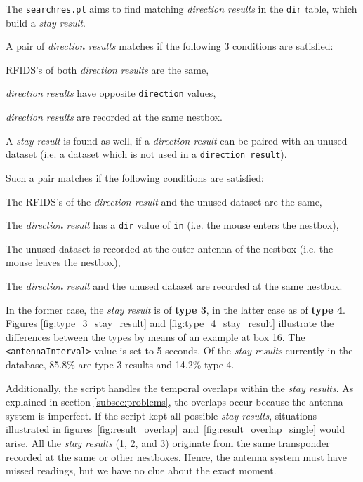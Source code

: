 The \lstinline|searchres.pl| aims to find matching \textit{direction results} in the \lstinline|dir| table, which build a \textit{stay result}.

A pair of \textit{direction results} matches if the following 3 conditions are satisfied:

\begin{mylist}
\item RFIDS's of both \textit{direction results} are the same,
\item \textit{direction results} have opposite \lstinline|direction| values,
\item \textit{direction results} are recorded at the same nestbox.
\end{mylist}

A \textit{stay result} is found as well, if a \textit{direction result} can be paired with an unused dataset (i.e. a dataset which is not used in a \lstinline|direction result|). 

Such a pair matches if the following conditions are satisfied:
 
\begin{mylist}
	\item The RFIDS's of the \textit{direction result} and the unused dataset are the same,
	\item The \textit{direction result} has a \lstinline|dir| value of \lstinline|in| (i.e. the mouse enters the nestbox),
	\item The unused dataset is recorded at the outer antenna of the nestbox (i.e. the mouse leaves the nestbox),
	\item The \textit{direction result} and the unused dataset are recorded at the same nestbox.  
\end{mylist}

In the former case, the \textit{stay result} is of \textbf{type 3}, in the latter case as of \textbf{type 4}. Figures \ref{fig:type_3_stay_result} and \ref{fig:type_4_stay_result} illustrate the differences between the types by means of an example at box 16. The \lstinline|<antennaInterval>| value is set to 5 seconds. Of the \textit{stay results} currently in the database, 85.8\% are type 3 results and 14.2\% type 4. 

Additionally, the script handles the temporal overlaps within the \textit{stay results}. As explained in section \ref{subsec:problems}, the overlaps occur because the antenna system is imperfect. If the script kept all possible \textit{stay results}, situations illustrated in figures~\ref{fig:result_overlap}~and~\ref{fig:result_overlap_single} would arise. All the \textit{stay results} (1, 2, and 3) originate from the same transponder recorded at the same or other nestboxes. Hence, the antenna system must have missed readings, but we have no clue about the exact moment.

